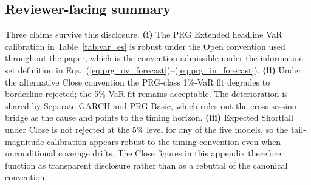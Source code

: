 \documentclass[11pt,a4paper]{article}
\begin{document}
\subsection*{Reviewer-facing summary}

Three claims survive this disclosure. \textbf{(i)} The PRG Extended
headline VaR calibration in Table~\ref{tab:var_es} is robust under the
Open convention used throughout the paper, which is the convention
admissible under the information-set definition in
Eqs.~(\ref{eq:prg_ov_forecast})--(\ref{eq:prg_in_forecast}).
\textbf{(ii)} Under the alternative Close convention the PRG-class
1\%-VaR fit degrades to borderline-rejected; the 5\%-VaR fit remains
acceptable. The deterioration is shared by Separate-GARCH and PRG Basic,
which rules out the cross-session bridge as the cause and points to the
timing horizon. \textbf{(iii)} Expected Shortfall under Close is not
rejected at the 5\% level for any of the five models, so the
tail-magnitude calibration appears robust to the timing convention even
when unconditional coverage drifts. The Close figures in this appendix
therefore function as transparent disclosure rather than as a rebuttal
of the canonical convention.


\end{document}
